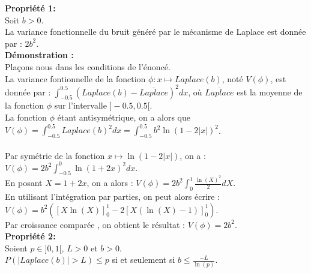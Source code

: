 \documentclass{article}
\begin{document}
\textbf{Propriété 1:}\\
Soit $b>0$.\\
La variance fonctionnelle du bruit généré par le mécanisme de Laplace est donnée par : $2b^2$.\\

\textbf{Démonstration :}\\
Plaçons nous dans les conditions de l'énoncé.\\
La variance fontionnelle de la fonction $\phi : x\mapsto Laplace(b) $, noté $V(\phi)$, est donnée par : $ \int_{-0.5}^{0.5} (Laplace(b) - \overline{Laplace})^2 dx$, où $\overline{Laplace}$
est la moyenne de la fonction $\phi$ sur l'intervalle $]-0.5, 0.5[$.\\
La fonction $\phi$ étant antisymétrique, on a alors que $V(\phi) = \int_{-0.5}^{0.5} Laplace(b) ^2dx =  \int_{-0.5}^{0.5} b^2\ln(1-2|x|)^2$.\\
\\
Par symétrie de la fonction $x\mapsto \ln(1-2|x|)$, on a : $V(\phi) =  2b^2\int_{-0.5}^{0} \ln(1+2x)^2dx$.\\
En posant $X = 1+2x$, on a alors : $V(\phi) =  2b^2\int_{0}^{1} \frac{\ln(X)^2}{2}dX$.\\
En utilisant l'intégration par parties, on peut alors écrire : $V(\phi) = b^2([X\ln(X)]_0^1 - 2[X(\ln(X)-1)]_0^1)$.\\
Par croissance comparée , on obtient le résultat : $V(\phi) = 2b^2$.\\

\textbf{Propriété 2:}\\
Soient $p \in ]0, 1[$, $L > 0$ et $b>0$.\\
$P( |Laplace(b)| > L) \leq p$ si et seulement si $b \leq \frac{-L}{\ln(p)}$.\\
\end{document}
